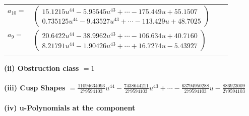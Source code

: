\documentclass[1p]{elsarticle_modified}
\theoremstyle{definition}
\begin{document}
\begin{tabular}{m{7pt} m{180pt} m{7pt} m{180pt} }
\flushright $a_{10}=$&$\begin{pmatrix}15.1215 u^{44}-5.95545 u^{43}+\cdots-175.449 u+55.1507\\0.735125 u^{44}-9.43527 u^{43}+\cdots-113.429 u+48.7025\end{pmatrix}$ \\
\flushright $a_{9}=$&$\begin{pmatrix}20.6422 u^{44}-38.9962 u^{43}+\cdots-106.634 u+40.7160\\8.21791 u^{44}-1.90426 u^{43}+\cdots+16.7274 u-5.43927\end{pmatrix}$\\&\end{tabular}
\flushleft \textbf{(ii) Obstruction class $= 1$}\\~\\
\flushleft \textbf{(iii) Cusp Shapes $= \frac{11094634093}{279594103} u^{44}-\frac{7438644211}{279594103} u^{43}+\cdots-\frac{63794950288}{279594103} u-\frac{886923009}{279594103}$}\\~\\
\newpage\renewcommand{\arraystretch}{1}
\flushleft \textbf{(iv) u-Polynomials at the component}\newline \\
\end{document}
